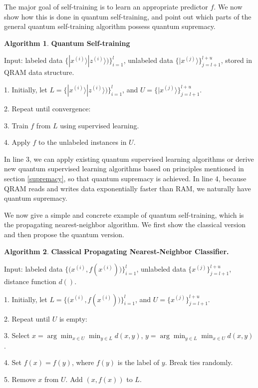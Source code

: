 \documentclass[11pt]{article}
\theoremstyle{definition}
\newtheorem{algorithm}{Algorithm}[section]
\def\zsi{z^{(i)}}
\def\xsi{x^{(i)}}
\def\xsj{x^{(j)}}
\begin{document}
The major goal of self-training is to learn an appropriate predictor $f$. We now show how this is done in quantum self-training, and point out which parts of the general quantum self-training algorithm possess quantum supremacy.

\begin{algorithm}
\textbf{Quantum Self-training}

Input: labeled data $\{ |\xsi\rangle |\zsi\rangle) \}_{i = 1}^l$, unlabeled data $\{ |\xsj\rangle \}_{j = l+1}^{l + u}$, stored in QRAM data structure.

1. Initially, let $L = \{ |\xsi\rangle |\zsi\rangle) \}_{i = 1}^l$, and $U = \{ |\xsj\rangle \}_{j = l+1}^{l + u}$.

2. Repeat until convergence:

3. Train $f$ from $L$ using supervised learning.

4. Apply $f$ to the unlabeled instances in $U$.

\end{algorithm}

In line 3, we can apply existing quantum supervised learning algorithms \cite{lloyd2013quantum, QMLNature, KernelPRL} or derive new quantum supervised learning algorithms based on principles mentioned in section \ref{supremacy}, so that quantum supremacy is achieved.
In line 4, because QRAM reads and writes data exponentially faster than RAM, we naturally have quantum supremacy.

We now give a simple and concrete example of quantum self-training, which is the propagating nearest-neighbor algorithm. We first show the classical version and then propose the quantum version. 


\begin{algorithm}
\textbf{Classical Propagating Nearest-Neighbor Classifier.}

Input: labeled data $\big\{ \big(\xsi, f(\xsi)\big) \big\}_{i = 1}^l$, unlabeled data $\{ \xsj \}_{j = l+1}^{l + u}$, distance function $d()$.

1. Initially, let $L = \big\{ \big(\xsi, f(\xsi)\big) \big\}_{i = 1}^l $, and $U = \{ \xsj \}_{j = l+1}^{l + u}$.

2. Repeat until $U$ is empty:

3. Select $x = \arg \min_{x \in U} \min_{y \in L} d(x, y)$, $y = \arg \min_{y \in L} \min_{x \in U} d(x,y)$.

4. Set $f(x) = f(y)$, where $f(y)$ is the label of $y$. Break ties randomly.

5. Remove $x$ from $U$. Add $(x, f(x))$ to $L$.

\end{algorithm}
\end{document}
